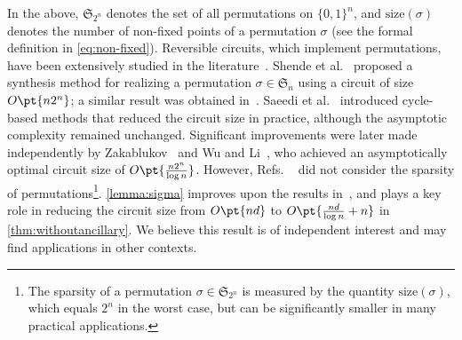\documentclass[a4paper,UKenglish,cleveref, autoref, thm-restate]{lipics-v2021}
\newcommand{\bo}{O\pt}
\begin{document}
In the above, $\mathfrak{S}_{2^n}$ denotes the set of all permutations on $\{0, 1\}^n$, and $\mathrm{size}(\sigma)$ denotes the number of non-fixed points of a permutation $\sigma$ (see the formal definition in \cref{eq:non-fixed}).  
Reversible circuits, which implement permutations, have been extensively studied in the literature~\cite{shende2003synthesis, brodsky2004reversible, wille2009bdd, saeedi2010reversible, saeedi2010library, saeedi2013synthesis, abdessaied2014upper, zakablukov2017asymptotic, li2023asymptotically, markov2008optimal, jiang2020optimal}.  
Shende et al.~\cite{shende2003synthesis} proposed a synthesis method for realizing a permutation $\sigma \in \mathfrak{S}_n$ using a circuit of size $\bo{n2^n}$; a similar result was obtained in~\cite{brodsky2004reversible}.  
Saeedi et al.~\cite{saeedi2010reversible, saeedi2010library} introduced cycle-based methods that reduced the circuit size in practice, although the asymptotic complexity remained unchanged.  
Significant improvements were later made independently by Zakablukov~\cite{zakablukov2017asymptotic} and  Wu and Li~\cite{li2023asymptotically}, who achieved an asymptotically optimal circuit size of $\bo{\frac{n2^n}{\log n}}$.  
However,  Refs. ~\cite{zakablukov2017asymptotic,li2023asymptotically} did not consider the sparsity of permutations\footnote{The sparsity of a permutation $\sigma \in \mathfrak{S}_{2^n}$ is measured by the quantity $\mathrm{size}(\sigma)$, which equals $2^n$ in the worst case, but can be significantly smaller in many practical applications.}.  
\cref{lemma:sigma} improves upon the results in~\cite{zakablukov2017asymptotic, li2023asymptotically}, and plays a key role in reducing the circuit size from $\bo{nd}$ to $\bo{\frac{nd}{\log n} + n}$ in \cref{thm:withoutancillary}. We believe this result is of independent interest and may find applications in other contexts.

 
\end{document}
